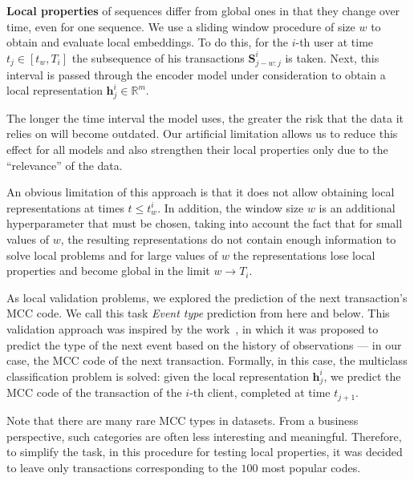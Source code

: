 \textbf{Local properties} of sequences differ from global ones in that they change over time, even for one sequence. 
We use a sliding window procedure of size $w$ to obtain and evaluate local embeddings. To do this, for the $i$-th user at time $t_{j}\in[t_{w}, T_{i}]$ the subsequence of his transactions $\mathbf{S}_{j-w:j}^{i }$ is taken.
Next, this interval is passed through the encoder model under consideration to obtain a local representation $\mathbf{h}_{j}^{i}\in\mathbb{R}^{m}$. 


The longer the time interval the model uses, the greater the risk that the data it relies on will become outdated. Our artificial limitation allows us to reduce this effect for all models and also strengthen their local properties only due to the “relevance” of the data.

An obvious limitation of this approach is that it does not allow obtaining local representations at times $t\leq t_{w}^{i}$.
In addition, the window size $w$ is an additional hyperparameter that must be chosen, taking into account the fact that for small values of $w$, the resulting representations do not contain enough information to solve local problems and for large values of $w$ the representations lose local properties and become global in the limit $w\to T_{i}$.

As local validation problems, we explored the prediction of the next transaction's MCC code. We call this task \textit{Event type} prediction from here and below. This validation approach was inspired by the work~\cite{zhuzhel2023continuous}, in which it was proposed to predict the type of the next event based on the history of observations --- in our case, the MCC code of the next transaction. Formally, in this case, the multiclass classification problem is solved: given the local representation $\mathbf{h}_{j}^{i}$, we predict the MCC code of the transaction of the $i$-th client, completed at time $t_{j+1}$.

Note that there are many rare MCC types in datasets. From a business perspective, such categories are often less interesting and meaningful. Therefore, to simplify the task, in this procedure for testing local properties, it was decided to leave only transactions corresponding to the $100$ most popular codes.

